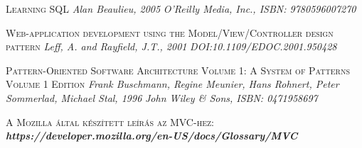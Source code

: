 \documentclass[
]{thesis-ekf}
\theoremstyle{definition}
\theoremstyle{remark}
\begin{document}
\begin{thebibliography}{2}
\textsc{Learning SQL}
\newline
\emph{Alan Beaulieu, 2005}
\emph{O'Reilly Media, Inc., ISBN: 9780596007270}

\textsc{Web-application development using the Model/View/Controller design pattern}
\newline
\emph{Leff, A. and Rayfield, J.T., 2001}
\emph{DOI:10.1109/EDOC.2001.950428}

\textsc{Pattern-Oriented Software Architecture Volume 1: A System of Patterns Volume 1 Edition}
\newline
\emph{Frank Buschmann, Regine Meunier, Hans Rohnert, Peter Sommerlad, Michael Stal, 1996}
\emph{John Wiley \& Sons, ISBN: 0471958697}

\textsc{A Mozilla által készített leírás az MVC-hez:}
\newline
\emph{\bf{https://developer.mozilla.org/en-US/docs/Glossary/MVC}}

\end{thebibliography}

%
\end{document}
